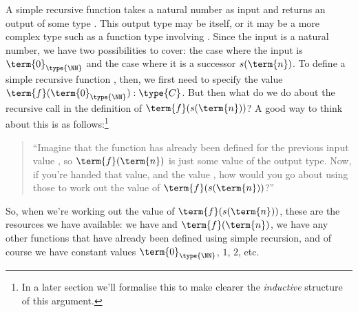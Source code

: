 A simple recursive function takes a natural number as input and returns an output of some type .  This output type may be \type{\NN} itself, or it may be a more complex type such as a function type involving \type{\NN}.  Since the input is a natural number, we have two possibilities to cover: the case where the input is $\term{0}_{\type{\NN}}$ and the case where it is a successor $s(\term{n})$.  To define a simple recursive function , then, we first need to specify the value $\term{f}(\term{0}_{\type{\NN}}):\type{C}$.  But then what do we do about the recursive call in the definition of $\term{f}(s(\term{n}))$?
A good way to think about this is as follows:\footnote{
In a later section we'll formalise this to make clearer the \emph{inductive} structure of this argument.
} 
\begin{quote}
``Imagine that the function  has already been defined for the previous input value , so $\term{f}(\term{n})$ is just some value of the output type.  Now, if you're handed that value, and the value , how would you go about using those to work out the value of $\term{f}(s(\term{n}))$?''
\end{quote}

So, when we're working out the value of $\term{f}(s(\term{n}))$, these are the resources we have available: we have  and $\term{f}(\term{n})$, we have any other functions that have already been defined using simple recursion, and of course we have constant values $\term{0}_{\type{\NN}}$, $1$, $2$, etc.  

